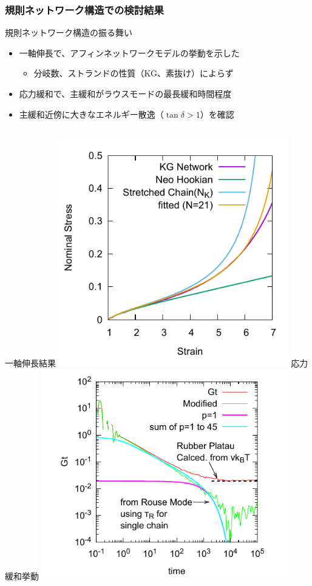 \documentclass[aspectratio=169,11pt, dvipdfmx]{beamer}
\begin{document}
\begin{frame}
	\frametitle{規則ネットワーク構造での検討結果}
		\small
		\begin{alertblock}{規則ネットワーク構造の振る舞い}
			\begin{itemize}
				\item 一軸伸長で、\alert{アフィンネットワークモデルの挙動}を示した
					\begin{itemize}
						\item \alert{分岐数、ストランドの性質（KG、素抜け）}によらず
					\end{itemize}
				\item 応力緩和で、主緩和がラウスモードの最長緩和時間程度
				\item 主緩和近傍に大きなエネルギー散逸（$\tan \delta > 1$）を確認
			\end{itemize}
		\end{alertblock}
		\begin{columns}[totalwidth=1\textwidth]
				\scriptsize
				一軸伸長結果
				\includegraphics[width=0.75\textwidth]{SS_Kuhn.pdf}
				\scriptsize
				応力緩和挙動
				\includegraphics[width=0.8\textwidth]{Gt_loglog.pdf}

\end{columns}
\end{frame}
\end{document}
